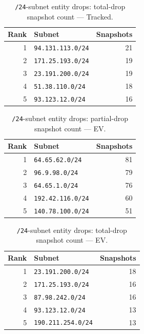 \documentclass[conference]{IEEEtran}
\begin{document}
\begin{table}[H]
\caption{\texttt{/24}-subnet entity drops: total-drop snapshot count --- Tracked.}
\begin{center}\small
\begin{tabular}{|r|l|r|}
\hline
\textbf{Rank} & \textbf{Subnet} & \textbf{Snapshots} \\ \hline
1 & \texttt{94.131.113.0/24} & 21 \\ \hline
2 & \texttt{171.25.193.0/24} & 19 \\ \hline
3 & \texttt{23.191.200.0/24} & 19 \\ \hline
4 & \texttt{51.38.110.0/24} & 18 \\ \hline
5 & \texttt{93.123.12.0/24} & 16 \\ \hline
\end{tabular}
\label{tab:subnetdrop_total_tracked}
\end{center}\end{table}
 
\begin{table}[H]
\caption{\texttt{/24}-subnet entity drops: partial-drop snapshot count --- EV.}
\begin{center}\small
\begin{tabular}{|r|l|r|}
\hline
\textbf{Rank} & \textbf{Subnet} & \textbf{Snapshots} \\ \hline
1 & \texttt{64.65.62.0/24} & 81 \\ \hline
2 & \texttt{96.9.98.0/24} & 79 \\ \hline
3 & \texttt{64.65.1.0/24} & 76 \\ \hline
4 & \texttt{192.42.116.0/24} & 60 \\ \hline
5 & \texttt{140.78.100.0/24} & 51 \\ \hline
\end{tabular}
\label{tab:subnetdrop_partial_ephemeral_variable}
\end{center}\end{table}
 
\begin{table}[H]
\caption{\texttt{/24}-subnet entity drops: total-drop snapshot count --- EV.}
\begin{center}\small
\begin{tabular}{|r|l|r|}
\hline
\textbf{Rank} & \textbf{Subnet} & \textbf{Snapshots} \\ \hline
1 & \texttt{23.191.200.0/24} & 18 \\ \hline
2 & \texttt{171.25.193.0/24} & 16 \\ \hline
3 & \texttt{87.98.242.0/24} & 16 \\ \hline
4 & \texttt{93.123.12.0/24} & 13 \\ \hline
5 & \texttt{190.211.254.0/24} & 13 \\ \hline
\end{tabular}
\label{tab:subnetdrop_total_ephemeral_variable}
\end{center}\end{table}
 
\end{document}
